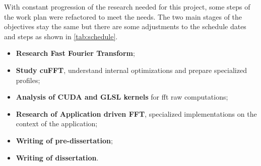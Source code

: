 \documentclass[
  oneside,
  11pt, a4paper,
  footinclude=true,
  headinclude=true,
  cleardoublepage=empty
]{scrbook}
\begin{document}

With constant progression of the research needed for this project, some steps of the work plan were refactored to meet the needs. The two main stages of the objectives stay the same but there are some adjustments to the schedule dates and steps as shown in \autoref{tab:schedule}.

\begin{itemize}
    \item \textbf{Research Fast Fourier Transform};
    \item \textbf{Study cuFFT}, understand internal optimizations and prepare specialized profiles;
    \item \textbf{Analysis of CUDA and GLSL kernels} for \acrshort{fft} raw computations;
    \item \textbf{Research of Application driven FFT}, specialized implementations on the context of the application;
    \item \textbf{Writing of pre-dissertation};
    \item \textbf{Writing of dissertation}.
\end{itemize}
\end{document}
